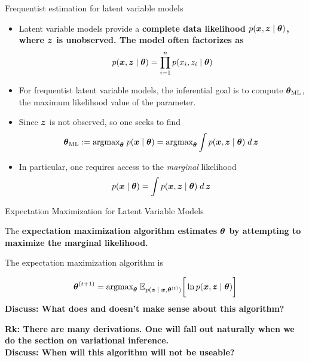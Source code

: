 \documentclass[10pt]{beamer}
\begin{document}
\begin{frame}{Frequentist estimation for latent variable models}
\footnotesize
\begin{itemize}
\item Latent variable models provide a \bf{complete data likelihood}  $p ({\boldsymbol x}, {\boldsymbol z} \; | \; {\boldsymbol \theta})$, where ${\boldsymbol z}$ is unobserved. The model often factorizes as
\[   p ({\boldsymbol x},  {\boldsymbol z} \; | \; {\boldsymbol \theta}) = \displaystyle\prod_{i=1}^n  p (x_i, z_i \; | \; {\boldsymbol \theta}) \]
\item For frequentist latent variable models, the inferential goal is to compute ${\boldsymbol \theta}_{\text{ML}}$, the maximum likelihood value of the parameter.  
\item Since ${\boldsymbol z}$ is not observed, so one seeks to find 
\begin{equation}
{\boldsymbol \theta}_{\text{ML}}:=  \text{argmax}_{{\boldsymbol \theta}} \; p ({\boldsymbol x} \; | \; {\boldsymbol \theta}) = \text{argmax}_{{\boldsymbol \theta}} \displaystyle\int p({\boldsymbol x},{\boldsymbol z} \; | \; {\boldsymbol \theta}) \; d \,{{\boldsymbol z}} \; 
\label{ml_latent_vars}
\end{equation}
\item In particular, one requires access to the \textit{marginal} likelihood
\begin{equation}
p({\boldsymbol x} \; | \; {\boldsymbol \theta}) = \displaystyle\int p({\boldsymbol x},{\boldsymbol z} \; | \; {\boldsymbol \theta}) \; d \,{{\boldsymbol z}} \; 
\label{marginal_likelihood}
\end{equation}
\end{itemize}
\end{frame}






\begin{frame}{Expectation Maximization for Latent Variable Models}

The \bf{expectation maximization algorithm} estimates ${\boldsymbol \theta}$ by attempting to maximize the marginal likelihood. 

The expectation maximization algorithm is 

\begin{equation}
\label{eqn:em_algorithm_appendix}
 {\boldsymbol \theta}^{(t+1)} =  \text{argmax}_{{\boldsymbol \theta}} \; \mathbb{E}_{p({\boldsymbol z} \; | \; {\boldsymbol x} , {\boldsymbol \theta}^{(t)})} \bigg[ \ln p({\boldsymbol x}, {\boldsymbol z} \; | \; {\boldsymbol \theta}) \bigg] 
 \end{equation}
 \vfill
\tiny \bf{Discuss:} What does and doesn't make sense about this algorithm? \\ %
\pause 

\tiny \bf{Rk:}  There are many derivations.  One will fall out naturally when we do the section on variational inference. \\

\pause 
\bf{Discuss:} When will this algorithm will not be useable?

\end{frame}
\end{document}
